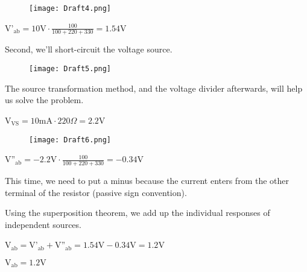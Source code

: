 \documentclass{article}
\begin{document}
\vspace{4mm}

\begin{figure}[H]
    \centering
    \texttt{[image: Draft4.png]}
\end{figure}

\vspace{4mm}

{V'$\displaystyle _\text{ab} = 10\text{V} \cdot \frac{100}{100+220+330} = 1.54\text{V}$}

\vspace{8mm}

{Second, we'll short-circuit the voltage source.}

\begin{figure}[H]
    \centering
    \texttt{[image: Draft5.png]}
\end{figure}

{The source transformation method, and the voltage divider afterwards, will help us solve the problem.}

\vspace{4mm}

{V$_\text{VS} = 10\text{mA} \cdot 220\Omega = 2.2\text{V}$}

\vspace{4mm}

\begin{figure}[H]
    \centering
    \texttt{[image: Draft6.png]}
\end{figure}

\vspace{4mm}

{V''$\displaystyle _\text{ab} = -2.2\text{V} \cdot \frac{100}{100+220+330} = -0.34\text{V}$}

\vspace{4mm}

{This time, we need to put a minus because the current enters from the other terminal of the resistor (passive sign convention).}

\vspace{4mm}

{Using the superposition theorem, we add up the individual responses of independent sources.}

\vspace{4mm}

{V$\displaystyle _\text{ab} = \text{V'}_\text{ab} + \text{V''}_\text{ab} = 1.54\text{V} - 0.34\text{V} = 1.2\text{V}$}

\vspace{4mm}

{$\displaystyle \boxed{ \text{V}_\text{ab} = 1.2\text{V}}$}
\end{document}
